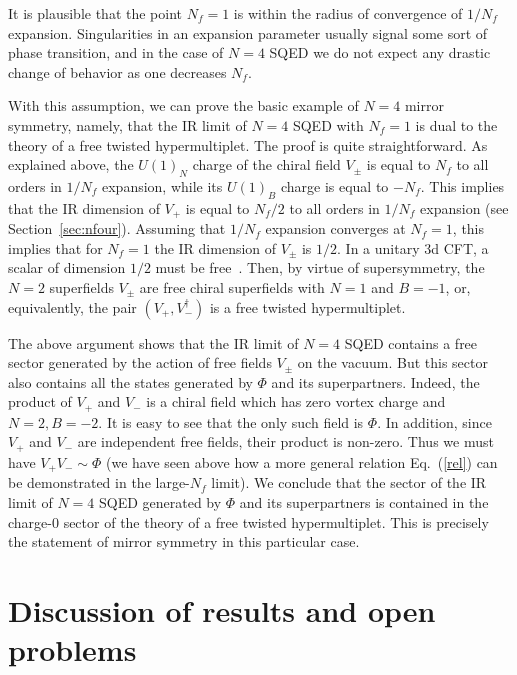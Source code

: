 \documentclass[a4paper,12pt, amsfonts, amssymb]{article}
\begin{document}
It is plausible that the point $N_f=1$ is within the radius of convergence
of $1/N_f$ expansion. Singularities in an expansion parameter usually
signal some sort of phase transition, and in the case of $N=4$ SQED we do not
expect any drastic change of behavior as one decreases $N_f$.

With this assumption, we can prove the basic example of $N=4$ mirror
symmetry, namely, that the IR limit of $N=4$ SQED with $N_f=1$ is
dual to the theory of a free twisted hypermultiplet. The proof is quite
straightforward. As explained above, the $U(1)_N$ charge
of the chiral field $V_\pm$ is equal to $N_f$ to all orders in 
$1/N_f$ expansion, while its $U(1)_B$ charge is equal to $-N_f$.
This implies that the IR dimension of $V_+$ is equal to $N_f/2$ to 
all orders in $1/N_f$ expansion (see Section~\ref{sec:nfour}). 
Assuming that $1/N_f$ expansion converges at $N_f=1$, this implies
that for $N_f=1$ the IR dimension of $V_\pm$ is $1/2$. In a unitary 3d CFT,
a scalar of dimension $1/2$ must be free~\cite{Minwalla}. Then, by virtue
of supersymmetry, the $N=2$ superfields $V_\pm$
are free chiral superfields with $N=1$ and $B=-1$, or, equivalently,
the pair $(V_+,V_-^\dag)$ is a free twisted hypermultiplet.

The above argument shows that the IR limit of $N=4$ SQED contains a free
sector generated by the action of free fields $V_\pm$ on the vacuum.
But this sector also contains all the states generated by $\Phi$ and its superpartners. Indeed, the product of $V_+$ and $V_-$ is a chiral field
which has zero vortex charge and $N=2,B=-2.$ It is easy to see that
the only such field is $\Phi$. In addition, since $V_+$ and $V_-$ are
independent free fields, their product is non-zero. Thus we must
have $V_+V_-\sim \Phi$ (we have seen above how a more general relation 
Eq.~(\ref{rel}) can be demonstrated in the large-$N_f$ limit). 
We conclude that the sector of the IR limit of $N=4$ SQED generated by 
$\Phi$ and its superpartners is contained in the charge-0 sector of the 
theory of a free twisted hypermultiplet. This is precisely the statement of
mirror symmetry in this particular case.
 
\section{Discussion of results and open problems}\label{sec:discussion}
\end{document}
